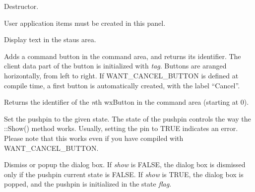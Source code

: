 

Destructor.



User application items must be created in this panel.



Display text in the staus area.




Adds a command button in the command area, and returns its identifier. The
client data part of the button is initialized with {\it tag}.
Buttons are aranged horizontally, from left to right. If WANT\_CANCEL\_BUTTON
is defined at compile time, a first button is automatically created, with
the label ``Cancel''.



Returns the identifier of the {\it n}th wxButton in the command area
(starting at 0).



Set the pushpin to the given state. The state of the pushpin controls the way
the ::Show() method works. Usually, setting the pin to TRUE indicates an
error. Please note that this works even if you have compiled with
WANT\_CANCEL\_BUTTON.



Dismiss or popup the dialog box. If {\it show} is FALSE, the dialog box
is dismissed only if the pushpin current state is FALSE. If {\it show}\rtfsp
is TRUE, the dialog box is popped, and the pushpin is initialized in the
state {\it flag}.

